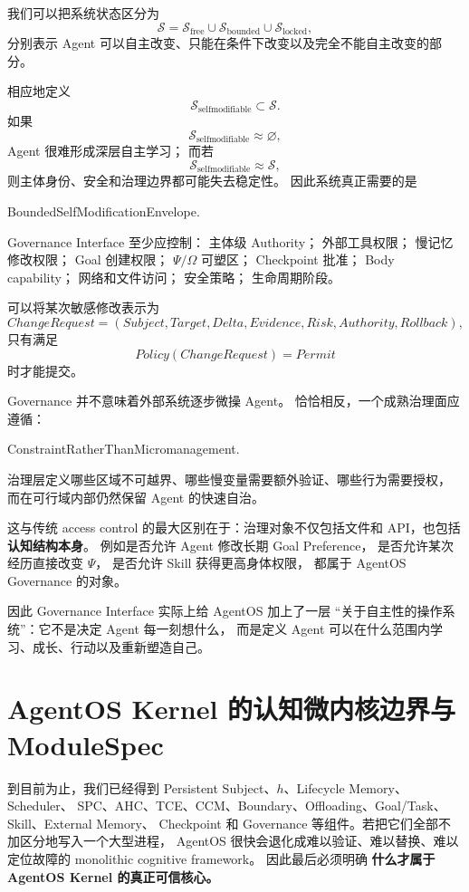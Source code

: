 我们可以把系统状态区分为
\[
\mathcal S
=
\mathcal S_{\mathrm{free}}
\cup
\mathcal S_{\mathrm{bounded}}
\cup
\mathcal S_{\mathrm{locked}},
\]
分别表示 Agent 可以自主改变、只能在条件下改变以及完全不能自主改变的部分。

相应地定义
\[
\mathcal S_{\mathrm{selfmodifiable}}
\subset
\mathcal S.
\]
如果
\[
\mathcal S_{\mathrm{selfmodifiable}}\approx\varnothing,
\]
Agent 很难形成深层自主学习；
而若
\[
\mathcal S_{\mathrm{selfmodifiable}}\approx\mathcal S,
\]
则主体身份、安全和治理边界都可能失去稳定性。
因此系统真正需要的是
\begin{statementbox}
BoundedSelfModificationEnvelope.
\end{statementbox}

Governance Interface 至少应控制：
主体级 Authority；
外部工具权限；
慢记忆修改权限；
Goal 创建权限；
$\Psi/\Omega$ 可塑区；
Checkpoint 批准；
Body capability；
网络和文件访问；
安全策略；
生命周期阶段。

可以将某次敏感修改表示为
\[
ChangeRequest
=
(
Subject,
Target,
Delta,
Evidence,
Risk,
Authority,
Rollback
),
\]
只有满足
\[
Policy(ChangeRequest)=Permit
\]
时才能提交。

Governance 并不意味着外部系统逐步微操 Agent。
恰恰相反，一个成熟治理面应遵循：
\begin{statementbox}
ConstraintRatherThanMicromanagement.
\end{statementbox}
治理层定义哪些区域不可越界、哪些慢变量需要额外验证、哪些行为需要授权，
而在可行域内部仍然保留 Agent 的快速自治。

这与传统 access control 的最大区别在于：治理对象不仅包括文件和 API，也包括
\textbf{认知结构本身}。
例如是否允许 Agent 修改长期 Goal Preference，
是否允许某次经历直接改变 $\Psi$，
是否允许 Skill 获得更高身体权限，
都属于 AgentOS Governance 的对象。

因此 Governance Interface 实际上给 AgentOS 加上了一层
``关于自主性的操作系统''：它不是决定 Agent 每一刻想什么，
而是定义 Agent 可以在什么范围内学习、成长、行动以及重新塑造自己。


\section{AgentOS Kernel 的认知微内核边界与 ModuleSpec}

到目前为止，我们已经得到 Persistent Subject、$h$、Lifecycle Memory、Scheduler、
SPC、AHC、TCE、CCM、Boundary、Offloading、Goal/Task、Skill、External Memory、
Checkpoint 和 Governance 等组件。若把它们全部不加区分地写入一个大型进程，
AgentOS 很快会退化成难以验证、难以替换、难以定位故障的 monolithic cognitive framework。
因此最后必须明确
\textbf{什么才属于 AgentOS Kernel 的真正可信核心。}

